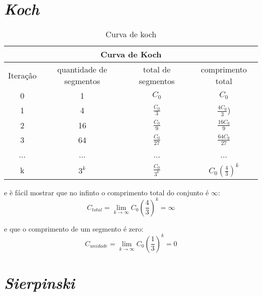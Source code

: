 \documentclass[12pt]{report}
\theoremstyle{definition}
\begin{document}
\section{\textit{Koch}}


{\renewcommand{\arraystretch}{1.5}
\begin{table}[h]
    \centering
        \begin{tabular}{| c | c | c | c |}
             \multicolumn{4}{c}{Curva de Koch} \\
             \hline
             Iteração & quantidade de segmentos & total de segmentos & comprimento total\\
             \hline
             0 & 1 & $ C_0 $ & $ C_0 $ \\
             \hline
             1 & 4 & $ \frac{ C_0 }{3} $ & $\frac{ 4C_{0} }{ 3 }$) \\
             \hline
             2 & 16 & $ \frac{ C_{0} }{9} $ & $\frac{ 16C_0}{9}$ \\
             \hline 
             3 & 64 & $ \frac{ C_{0} }{27} $ & $\frac{ 64C_0}{27}$ \\
             \hline
             ... & ... & ... & ... \\
             \hline
             k & $3^k$ & $ \frac{ C_{0} }{3^k} $ & $ C_0(\frac{4}{3})^k $ \\
             \hline
        \end{tabular}
    \caption{Curva de koch}
    \label{tab:koch}
\end{table}}

e è fácil mostrar que no infinto o comprimento total do conjunto é \(\infty\):
\[ C_{total} = \displaystyle \lim_{k\to\infty} C_0\left( \frac{4}{3} \right)^k = \infty \]

e que o comprimento de um segmento é zero:
\[ C_{unidade} = \displaystyle \lim_{k\to\infty} C_0\left( \frac{1}{3} \right)^k = 0 \]

\section{\textit{Sierpinski}}
\end{document}
